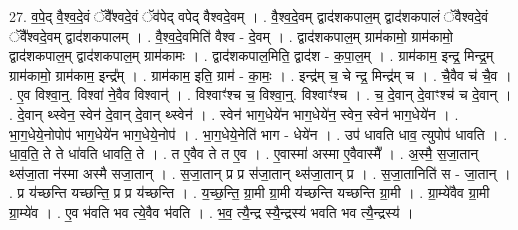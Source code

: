 \documentclass[17pt]{extarticle}
\begin{document}
27. व॒पे॒द् वै॒श्व॒दे॒वं ॅवै᳚श्वदे॒वं ॅव॑पेद् वपेद् वैश्वदे॒वम् । . वै॒श्व॒दे॒वम् द्वाद॑शकपाल॒म् द्वाद॑शकपालं ॅवैश्वदे॒वं ॅवै᳚श्वदे॒वम् द्वाद॑शकपालम् । . वै॒श्व॒दे॒वमिति॑ वैश्व - दे॒वम् । . द्वाद॑शकपाल॒म् ग्राम॑कामो॒ ग्राम॑कामो॒ द्वाद॑शकपाल॒म् द्वाद॑शकपाल॒म् ग्राम॑कामः । . द्वाद॑शकपाल॒मिति॒ द्वाद॑श - क॒पा॒ल॒म् । . ग्राम॑काम॒ इन्द्र॒ मिन्द्र॒म् ग्राम॑कामो॒ ग्राम॑काम॒ इन्द्र᳚म् । . ग्राम॑काम॒ इति॒ ग्राम॑ - का॒मः॒ । . इन्द्र॑म् च॒ चे न्द्र॒ मिन्द्र॑म् च । . चै॒वैव च॑ चै॒व । . ए॒व विश्वा॒न्॒. विश्वा॑ ने॒वैव विश्वान्॑ । . विश्वाꣳ॑श्च च॒ विश्वा॒न्॒. विश्वाꣳ॑श्च । . च॒ दे॒वान् दे॒वाꣳश्च॑ च दे॒वान् । . दे॒वान् थ्स्वेन॒ स्वेन॑ दे॒वान् दे॒वान् थ्स्वेन॑ । . स्वेन॑ भाग॒धेये॑न भाग॒धेये॑न॒ स्वेन॒ स्वेन॑ भाग॒धेये॑न । . भा॒ग॒धेये॒नोपोप॑ भाग॒धेये॑न भाग॒धेये॒नोप॑ । . भा॒ग॒धेये॒नेति॑ भाग - धेये॑न । . उप॑ धावति धाव॒ त्युपोप॑ धावति । . धा॒व॒ति॒ ते ते धा॑वति धावति॒ ते । . त ए॒वैव ते त ए॒व । . ए॒वास्मा॑ अस्मा ए॒वैवास्मै᳚ । . अ॒स्मै॒ स॒जा॒तान् थ्स॑जा॒ता न॑स्मा अस्मै सजा॒तान् । . स॒जा॒तान् प्र प्र स॑जा॒तान् थ्स॑जा॒तान् प्र । . स॒जा॒तानिति॑ स - जा॒तान् । . प्र य॑च्छन्ति यच्छन्ति॒ प्र प्र य॑च्छन्ति । . य॒च्छ॒न्ति॒ ग्रा॒मी ग्रा॒मी य॑च्छन्ति यच्छन्ति ग्रा॒मी । . ग्रा॒म्ये॑वैव ग्रा॒मी ग्रा॒म्ये॑व । . ए॒व भ॑वति भव त्ये॒वैव भ॑वति । . भ॒व॒ त्यै॒न्द्र स्यै॒न्द्रस्य॑ भवति भव त्यै॒न्द्रस्य॑ । \newline
\end{document}
